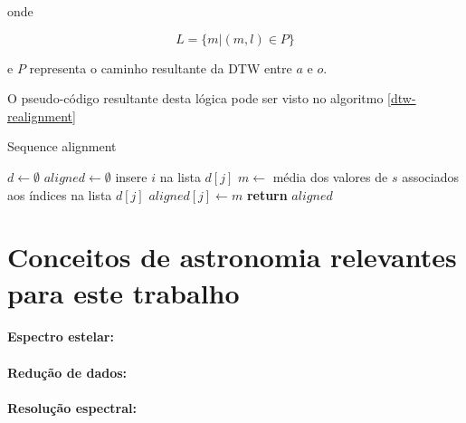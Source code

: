\noindent onde

\begin{equation*}
  L = \{m | (m, l) \in P\}
\end{equation*}

\noindent e $P$ representa o caminho resultante da DTW entre $a$ e $o$.

O pseudo-código resultante desta lógica pode ser visto no algoritmo \ref{dtw-realignment}

\begin{algorithm}
\caption{Sequence alignment}\label{dtw-realignment}
\begin{algorithmic}[1]
    \State $d \gets \emptyset$ 
    \State $aligned \gets \emptyset$
        \State insere $i$ na lista $d[j]$
    \EndFor
        \State $m \gets$ média dos valores de $s$ associados aos índices na lista $d[j]$
        \State $aligned[j] \gets m$
    \EndFor
\State \textbf{return} $aligned$
\EndProcedure
\end{algorithmic}
\end{algorithm}


\section{Conceitos de astronomia relevantes para este trabalho}

\paragraph{Espectro estelar: }

\paragraph{Redução de dados: }

\paragraph{Resolução espectral: }